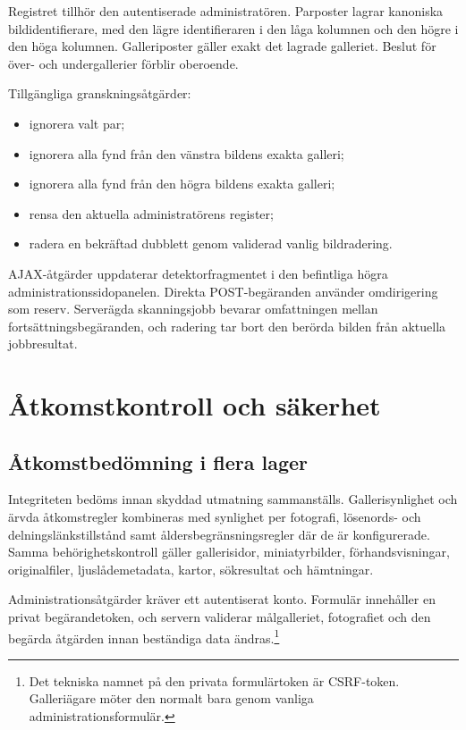 \documentclass[11pt,a4paper]{article}
\begin{document}
Registret tillhör den autentiserade administratören. Parposter lagrar kanoniska
bildidentifierare, med den lägre identifieraren i den låga kolumnen och den
högre i den höga kolumnen. Galleriposter gäller exakt det lagrade galleriet.
Beslut för över- och undergallerier förblir oberoende.

Tillgängliga granskningsåtgärder:

\begin{itemize}
  \item ignorera valt par;
  \item ignorera alla fynd från den vänstra bildens exakta galleri;
  \item ignorera alla fynd från den högra bildens exakta galleri;
  \item rensa den aktuella administratörens register;
  \item radera en bekräftad dubblett genom validerad vanlig bildradering.
\end{itemize}

AJAX-åtgärder uppdaterar detektorfragmentet i den befintliga högra
administrationssidopanelen. Direkta POST-begäranden använder omdirigering som
reserv. Serverägda skanningsjobb bevarar omfattningen mellan
fortsättningsbegäranden, och radering tar bort den berörda bilden från aktuella
jobbresultat.
\section{Åtkomstkontroll och säkerhet}
\label{sec:security}

\subsection{Åtkomstbedömning i flera lager}

Integriteten bedöms innan skyddad utmatning sammanställs. Gallerisynlighet och
ärvda åtkomstregler kombineras med synlighet per fotografi, lösenords- och
delningslänkstillstånd samt åldersbegränsningsregler där de är konfigurerade.
Samma behörighetskontroll gäller gallerisidor, miniatyrbilder,
förhandsvisningar, originalfiler, ljuslådemetadata, kartor, sökresultat och
hämtningar.

Administrationsåtgärder kräver ett autentiserat konto. Formulär innehåller en
privat begärandetoken, och servern validerar målgalleriet, fotografiet och den
begärda åtgärden innan beständiga data ändras.\footnote{Det tekniska namnet på
den privata formulärtoken är CSRF-token. Galleriägare möter den normalt bara
genom vanliga administrationsformulär.}
\end{document}
